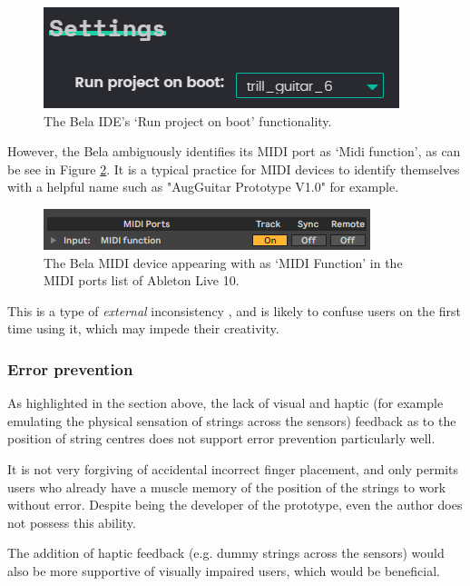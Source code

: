 \begin{figure}[h]
    \centering
    \includegraphics[scale=0.8]{Images/run on boot.png}
    \caption{The Bela IDE's `Run project on boot' functionality.}
    \label{fig:runonboot}
\end{figure}

However, the Bela ambiguously identifies its MIDI port as `Midi function', as can be see in Figure \ref{fig:midifunction}. It is a typical practice for MIDI devices to identify themselves with a helpful name such as "AugGuitar Prototype V1.0" for example.

\begin{figure}[h]
    \centering
    \includegraphics[scale=0.8]{Images/midi function.png}
    \caption{The Bela MIDI device appearing with as `MIDI Function' in the MIDI ports list of Ableton Live 10. }
    \label{fig:midifunction}
\end{figure}

This is a type of \textit{external} inconsistency \citep{nielsen_heuristic_1990}, and is likely to confuse users on the first time using it, which may impede their creativity. 

\subsubsection{Error prevention}

As highlighted in the section above, the lack of visual and haptic (for example emulating the physical sensation of strings across the sensors) feedback as to the position of string centres does not support error prevention particularly well. 

It is not very forgiving of accidental incorrect finger placement, and only permits users who already have a muscle memory of the position of the strings to work without error. Despite being the developer of the prototype, even the author does not possess this ability. 

The addition of haptic feedback (e.g. dummy strings across the sensors) would also be more supportive of visually impaired users, which would be beneficial. 

